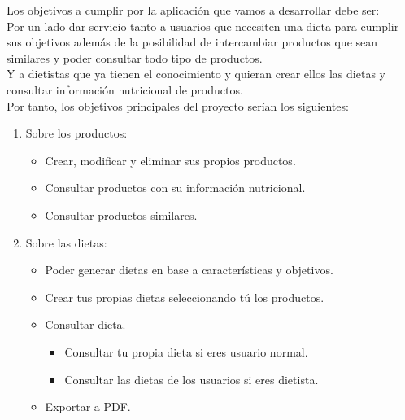Los objetivos a cumplir por la aplicación que vamos a desarrollar debe ser:\\

Por un lado dar servicio tanto a usuarios que necesiten una dieta para cumplir sus objetivos además de la posibilidad de intercambiar productos 
que sean similares y poder consultar todo tipo de productos.\\
Y a dietistas que ya tienen el conocimiento y quieran crear ellos las dietas y consultar información nutricional de productos.\\

Por tanto, los objetivos principales del proyecto serían los siguientes:

\begin{enumerate}
    \item
    Sobre los productos: 
    \begin{itemize}
      \item Crear, modificar y eliminar sus propios productos.
      \item Consultar productos con su información nutricional.
      \item Consultar productos similares.
    \end{itemize}
    \item
    Sobre las dietas: 
    \begin{itemize}
    \item Poder generar dietas en base a características y objetivos.
    \item Crear tus propias dietas seleccionando tú los productos.
    \item Consultar dieta.
        \begin{itemize}
        \item Consultar tu propia dieta si eres usuario normal.
        \item Consultar las dietas de los usuarios si eres dietista.
        \end{itemize}
    \item Exportar a PDF.
    \end{itemize}
\end{enumerate}